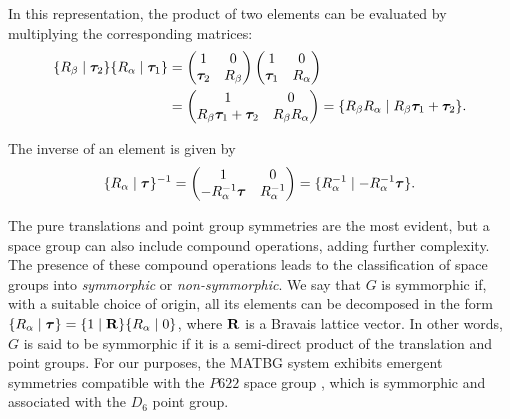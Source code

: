 \documentclass[12pt]{report}
\begin{document}
In this representation, the product of two elements can be evaluated by multiplying the corresponding matrices:
\begin{align}
\begin{split}
\{ R_\beta \mid {\bm{\tau}}_2 \} \{ R_\alpha \mid {\bm{\tau}}_1 \} &=
\begin{pmatrix}
1 & 0 \\
{\bm{\tau}}_2 & R_\beta
\end{pmatrix}
\begin{pmatrix}
1 & 0 \\
{\bm{\tau}}_1 & R_\alpha
\end{pmatrix} \\
&= \begin{pmatrix}
1 & 0 \\
R_\beta {\bm{\tau}}_1 + {\bm{\tau}}_2 & R_\beta R_\alpha
\end{pmatrix}
= \{ R_\beta R_\alpha \mid R_\beta {\bm{\tau}}_1 + {\bm{\tau}}_2 \}.
\end{split}
\end{align}

The inverse of an element is given by
\begin{equation} \label{eq:inv-spacegroup}
\{ R_\alpha \mid {\bm{\tau}} \}^{-1} =
\begin{pmatrix}
1 & 0 \\
-R_\alpha^{-1}{\bm{\tau}} & R_\alpha^{-1}
\end{pmatrix} =
\{ R_\alpha^{-1} \mid -R_\alpha^{-1}{\bm{\tau}} \}.
\end{equation}

The pure translations and point group symmetries are the most evident, but a space group can also include compound operations, adding further complexity. The presence of these compound operations leads to the classification of space groups into \textit{symmorphic} or \textit{non-symmorphic}. We say that $G$ is symmorphic if, with a suitable choice of origin, all its elements can be decomposed in the form $\{ R_\alpha \mid {\bm{\tau}} \} = \{ 1 \mid \vb{R} \} \{ R_\alpha \mid 0 \}$, where $\vb{R}$ is a Bravais lattice vector. In other words, $G$ is said to be symmorphic if it is a semi-direct product of the translation and point groups. For our purposes, the MATBG system exhibits emergent symmetries compatible with the $P622$ space group \cite{thesis_rennella}, which is symmorphic and associated with the $D_6$ point group.
\end{document}
